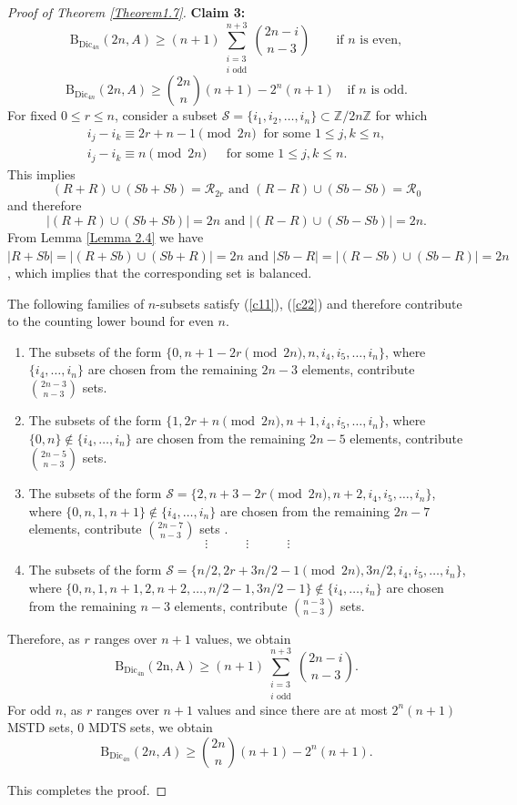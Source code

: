 \documentclass[11pt,reqno]{amsart}
\numberwithin{equation}{section}
\begin{document}
\begin{proof}[Proof of Theorem \ref{Theorem1.7}]
\noindent\textbf{Claim 3:} $$\mathrm{B}_{\mathrm{Dic}_{4n}}(2n,A)\geq(n+1)\sum_{\substack{i=3\\i\text{~odd}}}^{n+3}\binom{2n-i}{n-3} \quad \quad \text{if } n \text{ is even},$$ $$\mathrm{B}_{\mathrm{Dic}_{4n}}(2n,A)\geq \binom{2n}{n}(n+1)-2^{n}(n+1) \quad \text{if } n \text{ is odd}.$$
For fixed $0\leq r\leq n$,  consider a subset $\mathcal{S}=\{i_1,i_2,\ldots,i_n\}\subset  \mathbb{Z}/2n\mathbb{Z}$ for which
\begin{align}
i_j-i_k\equiv 2r+n-1\pmod{2n}~\text{ for some } 1\leq j,k\leq n, \label{c11}\\
i_j-i_k\equiv n \pmod{2n}\quad ~\text{ for some } 1\leq j,k\leq n. \label{c22}
\end{align}
This implies $$(R+R)\cup(Sb+Sb)=\mathcal{R}_{2r} \text{ and } (R-R)\cup (Sb-Sb)= \mathcal{R}_0$$ and therefore  $$|(R+R)\cup(Sb+Sb)|=2n \text{ and } |(R-R)\cup (Sb-Sb)|=2n.$$  
From Lemma \ref{Lemma 2.4} we have $|R+Sb|=|(R+Sb)\cup(Sb+R)|=2n \text{ and } |Sb-R|=|(R-Sb)\cup (Sb-R)|=2n$, which implies that the corresponding set is balanced. 

The following families of 
$n$-subsets satisfy (\ref{c11}), (\ref{c22}) and therefore contribute to the counting lower bound for even $n$.
 \begin{enumerate}
    \item The subsets of the form  $\{0,n+1-2r \pmod{2n}, n,i_4,i_5,\ldots, i_n\}$, where $\{i_4,\ldots, i_n\}$  are chosen from  the  remaining $2n-3$ elements, contribute  $\binom{2n-3}{n-3}$ sets.

\item The subsets of the form  $\{1,2r+n \pmod{2n},n+1 ,i_4, i_5,\ldots, i_n\}$, where $\{0,n\}\not\in\{i_4,\ldots, i_n\}$ are chosen from  the  remaining $2n-5$ elements, contribute  $\binom{2n-5}{n-3}$ sets.

\item The subsets of the form $\mathcal{S}=\{2,n+3-2r \pmod{2n},n+2 ,i_4, i_5,\ldots, i_n\}$, where $\{0,n,1,n+1\}\not\in \{i_4,\ldots, i_n\}$ are chosen from  the  remaining $2n-7$ elements, contribute $\binom{2n-7}{n-3}$ sets .
$$\vdots\quad \quad \quad \vdots\quad \quad \quad \vdots$$
\item[(n/2)] The subsets of the form $\mathcal{S}=\{n/2,2r+3n/2-1 \pmod{2n},3n/2 ,i_4, i_5,\ldots, i_n\}$, where $\{0,n,1,n+1,2,n+2,\ldots,n/2-1,3n/2-1\}\not\in\{i_4,\ldots, i_n\}$ are chosen from  the  remaining $n-3$ elements, contribute $\binom{n-3}{n-3}$ sets.
\end{enumerate}
Therefore, as $r$ ranges over $n+1$ values, we obtain
$$\mathrm{B_{\mathrm{Dic_{4n}}}(2n,A)}\geq (n+1) \sum_{\substack{i=3\\i\text{~odd}}}^{n+3}\binom{2n-i}{n-3}.$$
For odd $n$, as $r$ ranges over $n+1$ values and since there are at most $2^n(n+1)$ MSTD sets, $0$ MDTS sets, we obtain 
$$\mathrm{B}_{\mathrm{Dic}_{4n}}(2n,A)\geq \binom{2n}{n}(n+1)-2^{n}(n+1).$$

This completes the proof.
\end{proof}
\end{document}
